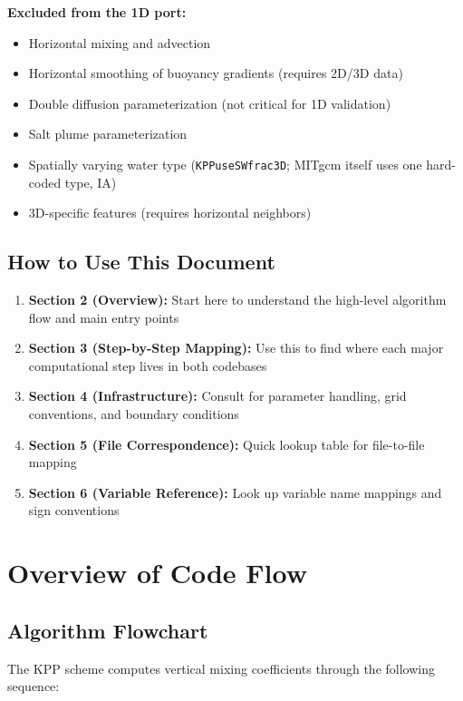 \documentclass[11pt]{article}
\begin{document}
\textbf{Excluded from the 1D port:}
\begin{itemize}
    \item Horizontal mixing and advection
    \item Horizontal smoothing of buoyancy gradients (requires 2D/3D data)
    \item Double diffusion parameterization (not critical for 1D validation)
    \item Salt plume parameterization
    \item Spatially varying water type (\verb|KPPuseSWfrac3D|; MITgcm itself uses one hard-coded type, IA)
    \item 3D-specific features (requires horizontal neighbors)
\end{itemize}

\subsection{How to Use This Document}

\begin{enumerate}
    \item \textbf{Section 2 (Overview):} Start here to understand the high-level algorithm flow and main entry points
    \item \textbf{Section 3 (Step-by-Step Mapping):} Use this to find where each major computational step lives in both codebases
    \item \textbf{Section 4 (Infrastructure):} Consult for parameter handling, grid conventions, and boundary conditions
    \item \textbf{Section 5 (File Correspondence):} Quick lookup table for file-to-file mapping
    \item \textbf{Section 6 (Variable Reference):} Look up variable name mappings and sign conventions
\end{enumerate}

\section{Overview of Code Flow}
\label{sec:overview}

\subsection{Algorithm Flowchart}

The KPP scheme computes vertical mixing coefficients through the following sequence:
\end{document}
